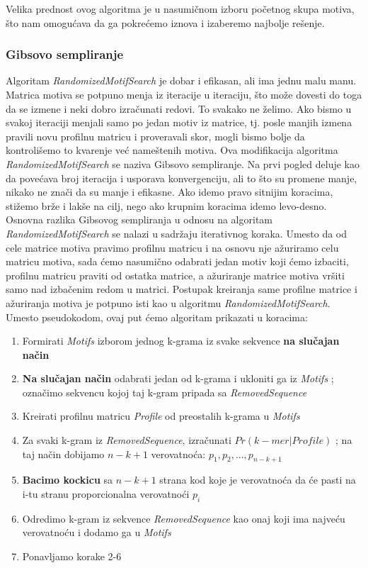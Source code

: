\newpage

Velika prednost ovog algoritma je u nasumičnom izboru početnog skupa motiva, što nam omogućava da ga pokrećemo iznova i izaberemo najbolje rešenje.

\subsubsection{Gibsovo sempliranje}
Algoritam \textit{RandomizedMotifSearch} je dobar i efikasan, ali ima jednu malu manu. Matrica motiva se potpuno menja iz iteracije u iteraciju, što može dovesti do toga da se izmene i neki dobro izračunati redovi. To svakako ne želimo. Ako bismo u svakoj iteraciji menjali samo po jedan motiv iz matrice, tj. posle manjih izmena pravili novu profilnu matricu i proveravali skor, mogli bismo bolje da kontrolišemo to kvarenje već nameštenih motiva. Ova modifikacija algoritma \textit{RandomizedMotifSearch} se naziva Gibsovo sempliranje. Na prvi pogled deluje kao da povećava broj iteracija i usporava konvergenciju, ali to što su promene manje, nikako ne znači da su manje i efikasne. Ako idemo pravo sitnijim koracima, stižemo brže i lakše na cilj, nego ako krupnim koracima idemo levo-desno. 
Osnovna razlika Gibsovog sempliranja u odnosu na algoritam \textit{RandomizedMotifSearch} se nalazi u sadržaju iterativnog koraka. Umesto da od cele matrice motiva pravimo profilnu matricu i na osnovu nje ažuriramo celu matricu motiva, sada ćemo nasumično odabrati jedan motiv koji ćemo izbaciti, profilnu matricu praviti od ostatka matrice, a ažuriranje matrice motiva vršiti samo nad izbačenim redom u matrici. Postupak kreiranja same profilne matrice i ažuriranja motiva je potpuno isti kao u algoritmu \textit{RandomizedMotifSearch}. Umesto pseudokodom, ovaj put ćemo algoritam prikazati u koracima:

\begin{enumerate}
    \item Formirati \textit{Motifs} izborom jednog k-grama iz svake sekvence \textbf{na slučajan način}
    \item \textbf{Na slučajan način} odabrati jedan od k-grama i ukloniti ga iz \textit{Motifs} ; označimo sekvencu kojoj taj k-gram pripada sa \textit{RemovedSequence}
    \item Kreirati profilnu matricu \textit{Profile} od preostalih k-grama u \textit{Motifs}
    \item Za svaki k-gram iz \textit{RemovedSequence}, izračunati $Pr(k-mer|Profile)$ ; na taj način dobijamo $n-k+1$ verovatnoća: $p_1, p_2, ..., p_{n-k+1}$
    \item \textbf{Bacimo kockicu} sa $n-k+1$ strana kod koje je verovatnoća da će pasti na i-tu stranu proporcionalna verovatnoći $p_i$
    \item Odredimo k-gram iz sekvence \textit{RemovedSequence} kao onaj koji ima najveću verovatnoću i dodamo ga u \textit{Motifs}
    \item Ponavljamo korake 2-6
\end{enumerate}

